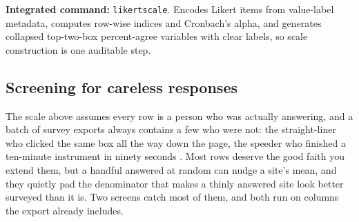 \documentclass[
    a4paper,
    fontsize=10pt,
    twoside=true,
    numbers=noenddot,
]{kaobook}
\begin{document}
\begin{kaobox}[frametitle=Package Integration: \texttt{likertscale}]
\textbf{Integrated command:} \texttt{likertscale}. Encodes Likert items from value-label metadata, computes row-wise indices and Cronbach's alpha, and generates collapsed top-two-box percent-agree variables with clear labels, so scale construction is one auditable step.
\end{kaobox}

\subsection{Screening for careless responses}\label{sec:ch05-careless}
The scale above assumes every row is a person who was actually answering, and a batch of survey exports always contains a few who were not: the straight-liner who clicked the same box all the way down the page, the speeder who finished a ten-minute instrument in ninety seconds \parencite{osborne2013cleaning}. Most rows deserve the good faith you extend them, but a handful answered at random can nudge a site's mean, and they quietly pad the denominator that makes a thinly answered site look better surveyed than it is. Two screens catch most of them, and both run on columns the export already includes.
\end{document}

